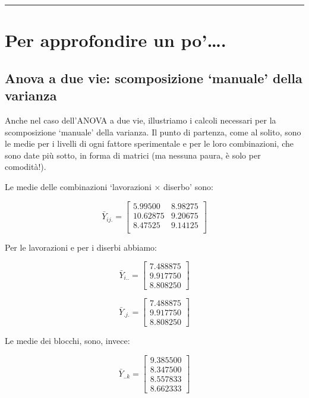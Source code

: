 \documentclass[a4paper,12pt,oneside]{book}
\begin{document}
\begin{center}\rule{0.5\linewidth}{\linethickness}\end{center}

\hypertarget{per-approfondire-un-po.}{%
\section{Per approfondire un po'\ldots{}.}\label{per-approfondire-un-po.}}

\hypertarget{anova-a-due-vie-scomposizione-manuale-della-varianza}{%
\subsection{Anova a due vie: scomposizione `manuale' della varianza}\label{anova-a-due-vie-scomposizione-manuale-della-varianza}}

Anche nel caso dell'ANOVA a due vie, illustriamo i calcoli necessari per la scomposizione `manuale' della varianza. Il punto di partenza, come al solito, sono le medie per i livelli di ogni fattore sperimentale e per le loro combinazioni, che sono date più sotto, in forma di matrici (ma nessuna paura, è solo per comodità!).

Le medie delle combinazioni `lavorazioni \(\times\) diserbo' sono:

\[ \bar{Y}_{ij.} = \left[ {\begin{array}{rr}
5.99500 & 8.98275 \\
10.62875 & 9.20675 \\
8.47525  & 9.14125 \\
\end{array}} \right]\]

Per le lavorazioni e per i diserbi abbiamo:

\[ \bar{Y}_{i..} = \left[ {\begin{array}{r}
7.488875 \\
9.917750 \\
8.808250
\end{array}} \right]\]

\[ \bar{Y}_{.j.} = \left[ {\begin{array}{r}
7.488875 \\
9.917750 \\
8.808250
\end{array}} \right]\]

Le medie dei blocchi, sono, invece:

\[ \bar{Y}_{..k} = \left[ {\begin{array}{r}
9.385500 \\
8.347500 \\
8.557833 \\
8.662333
\end{array}} \right]\]
\end{document}
